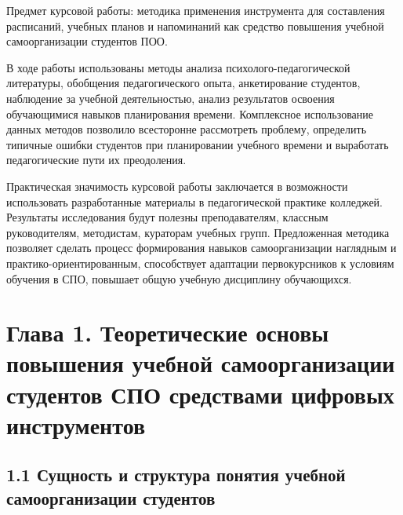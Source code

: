 \documentclass[
]{article}
\begin{document}
Предмет курсовой работы: методика применения инструмента для составления
расписаний, учебных планов и напоминаний как средство повышения учебной
самоорганизации студентов ПОО.

В ходе работы использованы методы анализа психолого-педагогической
литературы, обобщения педагогического опыта, анкетирование студентов,
наблюдение за учебной деятельностью, анализ результатов освоения
обучающимися навыков планирования времени. Комплексное использование
данных методов позволило всесторонне рассмотреть проблему, определить
типичные ошибки студентов при планировании учебного времени и выработать
педагогические пути их преодоления.

Практическая значимость курсовой работы заключается в возможности
использовать разработанные материалы в педагогической практике
колледжей. Результаты исследования будут полезны преподавателям,
классным руководителям, методистам, кураторам учебных групп.
Предложенная методика позволяет сделать процесс формирования навыков
самоорганизации наглядным и практико-ориентированным, способствует
адаптации первокурсников к условиям обучения в СПО, повышает общую
учебную дисциплину обучающихся.

\section{\texorpdfstring{\textbf{Глава 1. Теоретические основы повышения
учебной самоорганизации студентов СПО средствами цифровых
инструментов}}{Глава 1. Теоретические основы повышения учебной самоорганизации студентов СПО средствами цифровых инструментов}}\label{ux433ux43bux430ux432ux430-1.-ux442ux435ux43eux440ux435ux442ux438ux447ux435ux441ux43aux438ux435-ux43eux441ux43dux43eux432ux44b-ux43fux43eux432ux44bux448ux435ux43dux438ux44f-ux443ux447ux435ux431ux43dux43eux439-ux441ux430ux43cux43eux43eux440ux433ux430ux43dux438ux437ux430ux446ux438ux438-ux441ux442ux443ux434ux435ux43dux442ux43eux432-ux441ux43fux43e-ux441ux440ux435ux434ux441ux442ux432ux430ux43cux438-ux446ux438ux444ux440ux43eux432ux44bux445-ux438ux43dux441ux442ux440ux443ux43cux435ux43dux442ux43eux432}

\subsection{\texorpdfstring{\textbf{1.1 Сущность и структура понятия
учебной самоорганизации
студентов}}{1.1 Сущность и структура понятия учебной самоорганизации студентов}}\label{ux441ux443ux449ux43dux43eux441ux442ux44c-ux438-ux441ux442ux440ux443ux43aux442ux443ux440ux430-ux43fux43eux43dux44fux442ux438ux44f-ux443ux447ux435ux431ux43dux43eux439-ux441ux430ux43cux43eux43eux440ux433ux430ux43dux438ux437ux430ux446ux438ux438-ux441ux442ux443ux434ux435ux43dux442ux43eux432}
\end{document}
